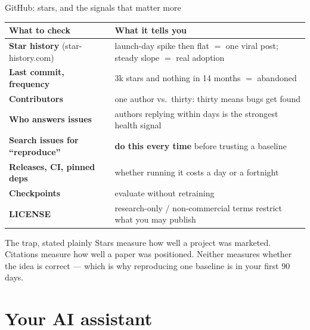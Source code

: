 \documentclass[aspectratio=169,11pt]{beamer}
\newcommand{\key}[1]{\textbf{\color{brand}#1}}
\begin{document}
\begin{frame}{GitHub: stars, and the signals that matter more}
\footnotesize
\begin{tabularx}{\textwidth}{>{\raggedright\arraybackslash}p{4.3cm} X}
\toprule
\textbf{\color{brand}What to check} & \textbf{\color{brand}What it tells you} \\
\midrule
\rowcolor{rowtint} \textbf{Star history} (star-history.com) & launch-day spike then flat $=$ one viral post; steady slope $=$ real adoption \\
\textbf{Last commit, frequency} & 3k stars and nothing in 14 months $=$ abandoned \\
\rowcolor{rowtint} \textbf{Contributors} & one author vs.\ thirty: thirty means bugs get found \\
\textbf{Who answers issues} & authors replying within days is the strongest health signal \\
\rowcolor{rowtint} \textbf{Search issues for ``reproduce''} & \key{do this every time} before trusting a baseline \\
\textbf{Releases, CI, pinned deps} & whether running it costs a day or a fortnight \\
\rowcolor{rowtint} \textbf{Checkpoints} & evaluate without retraining \\
\textbf{LICENSE} & research-only / non-commercial terms restrict what you may publish \\
\bottomrule
\end{tabularx}
\vspace{2mm}
\centering
\begin{minipage}{0.88\textwidth}
\begin{alertblock}{The trap, stated plainly}
\footnotesize
Stars measure how well a project was marketed. Citations measure how well a
paper was positioned. Neither measures whether the idea is correct --- which is
why reproducing one baseline is in your first 90 days.
\end{alertblock}
\end{minipage}
\end{frame}

\section{Your AI assistant}
\end{document}

